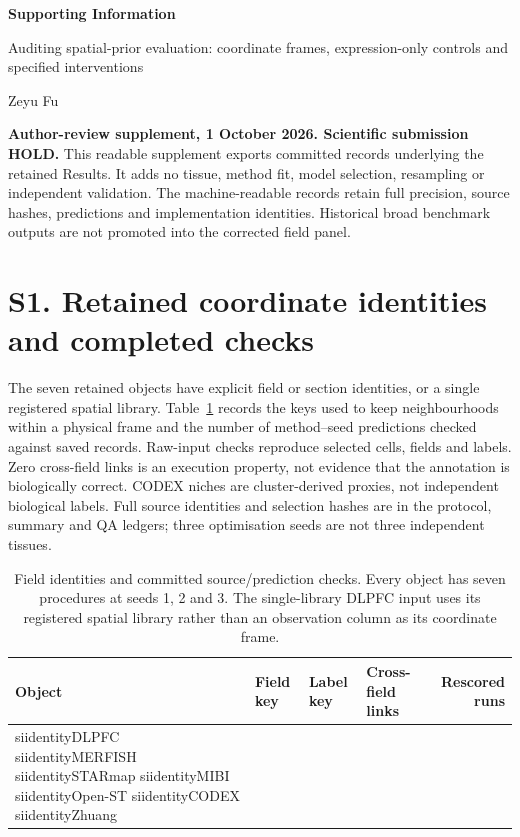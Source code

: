 \documentclass[11pt]{article}
\begin{document}
\begin{center}
{\Large\bfseries Supporting Information}\par\smallskip
{\large Auditing spatial-prior evaluation: coordinate frames,
expression-only controls and specified interventions}\par\medskip
Zeyu Fu
\end{center}
\textbf{Author-review supplement, 1 October 2026. Scientific submission HOLD.}
This readable supplement exports committed records underlying the retained
Results. It adds no tissue, method fit, model selection, resampling or
independent validation. The machine-readable records retain full precision,
source hashes, predictions and implementation identities. Historical broad
benchmark outputs are not promoted into the corrected field panel.

\section*{S1. Retained coordinate identities and completed checks}
The seven retained objects have explicit field or section identities, or a
single registered spatial library. Table~\ref{tab:identities} records the
keys used to keep neighbourhoods within a physical frame and the number of
method--seed predictions checked against saved records. Raw-input checks
reproduce selected cells, fields and labels. Zero cross-field links is an
execution property, not evidence that the annotation is biologically correct.
CODEX niches are cluster-derived proxies, not independent biological labels.
Full source identities and selection hashes are in the protocol, summary and
QA ledgers; three optimisation seeds are not three independent tissues.

\begin{table}[H]\centering\small
\caption{Field identities and committed source/prediction checks.
Every object has seven procedures at seeds 1, 2 and 3. The single-library
DLPFC input uses its registered spatial library rather than an observation
column as its coordinate frame.}
\label{tab:identities}
\begin{tabular}{llllr}\toprule
Object & Field key & Label key & Cross-field links & Rescored runs\\\midrule
\csname siidentityDLPFC\endcsname
\csname siidentityMERFISH\endcsname
\csname siidentitySTARmap\endcsname
\csname siidentityMIBI\endcsname
\csname siidentityOpen-ST\endcsname
\csname siidentityCODEX\endcsname
\csname siidentityZhuang\endcsname
\bottomrule\end{tabular}
\end{table}
\end{document}
